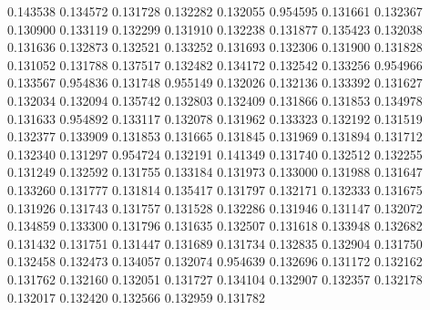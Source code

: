 0.143538
0.134572
0.131728
0.132282
0.132055
0.954595
0.131661
0.132367
0.130900
0.133119
0.132299
0.131910
0.132238
0.131877
0.135423
0.132038
0.131636
0.132873
0.132521
0.133252
0.131693
0.132306
0.131900
0.131828
0.131052
0.131788
0.137517
0.132482
0.134172
0.132542
0.133256
0.954966
0.133567
0.954836
0.131748
0.955149
0.132026
0.132136
0.133392
0.131627
0.132034
0.132094
0.135742
0.132803
0.132409
0.131866
0.131853
0.134978
0.131633
0.954892
0.133117
0.132078
0.131962
0.133323
0.132192
0.131519
0.132377
0.133909
0.131853
0.131665
0.131845
0.131969
0.131894
0.131712
0.132340
0.131297
0.954724
0.132191
0.141349
0.131740
0.132512
0.132255
0.131249
0.132592
0.131755
0.133184
0.131973
0.133000
0.131988
0.131647
0.133260
0.131777
0.131814
0.135417
0.131797
0.132171
0.132333
0.131675
0.131926
0.131743
0.131757
0.131528
0.132286
0.131946
0.131147
0.132072
0.134859
0.133300
0.131796
0.131635
0.132507
0.131618
0.133948
0.132682
0.131432
0.131751
0.131447
0.131689
0.131734
0.132835
0.132904
0.131750
0.132458
0.132473
0.134057
0.132074
0.954639
0.132696
0.131172
0.132162
0.131762
0.132160
0.132051
0.131727
0.134104
0.132907
0.132357
0.132178
0.132017
0.132420
0.132566
0.132959
0.131782
